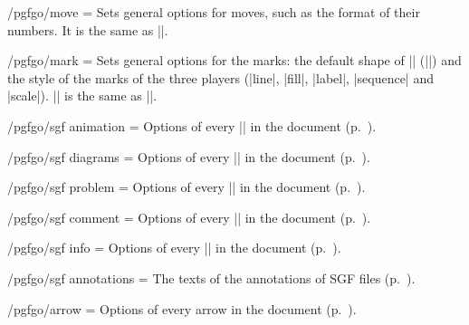 \begin{key}{/pgfgo/move = }
	Sets general options for moves, such as the format of their numbers. It is the same as ||.
\end{key}

\begin{key}{/pgfgo/mark = }
	Sets general options for the marks: the default shape of |\marks| (||) and the style of the marks of the three players (|line|, |fill|, |label|, |sequence| and |scale|). || is the same as ||.
\end{key}

\begin{key}{/pgfgo/sgf animation = }
	Options of every |\sgfanimation| in the document (p.~\pageref{subsec:sgf}).
\end{key}

\begin{key}{/pgfgo/sgf diagrams = }
	Options of every |\sgfdiagrams| in the document (p.~\pageref{subsec:sgf}).
\end{key}

\begin{key}{/pgfgo/sgf problem = }
	Options of every |\sgfproblem| in the document (p.~\pageref{subsec:sgf}).
\end{key}

\begin{key}{/pgfgo/sgf comment = }
	Options of every |\sgfcomment| in the document (p.~\pageref{subsec:sgf}).
\end{key}

\begin{key}{/pgfgo/sgf info = }
	Options of every |\sgfinfo| in the document (p.~\pageref{subsec:sgf}).
\end{key}

\begin{key}{/pgfgo/sgf annotations = }
	The texts of the annotations of SGF files (p.~\pageref{subsec:sgf}).
\end{key}

\begin{key}{/pgfgo/arrow = }
	Options of every arrow in the document (p.~\pageref{subsec:arrows}).
\end{key}

